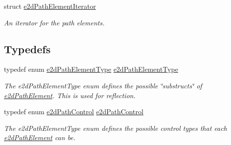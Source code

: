\begin{DoxyCompactItemize}
struct \hyperlink{structe2dPathElementIterator}{e2d\-Path\-Element\-Iterator}
\begin{DoxyCompactList}\small\item\em An iterator for the path elements. \end{DoxyCompactList}\end{DoxyCompactItemize}
\subsection*{Typedefs}
\begin{DoxyCompactItemize}
\item 
\hypertarget{group__e2dPath_gaa09c0421dbddd84d49f51a8027690c14}{typedef enum \hyperlink{group__e2dPath_gabecf8438085bebe6b28b4a8fb69b1507}{e2d\-Path\-Element\-Type} \hyperlink{group__e2dPath_gaa09c0421dbddd84d49f51a8027690c14}{e2d\-Path\-Element\-Type}}\label{group__e2dPath_gaa09c0421dbddd84d49f51a8027690c14}

\begin{DoxyCompactList}\small\item\em The e2d\-Path\-Element\-Type enum defines the possible \char`\"{}substructs\char`\"{} of \hyperlink{structe2dPathElement}{e2d\-Path\-Element}. This is used for reflection. \end{DoxyCompactList}\item 
\hypertarget{group__e2dPath_ga0d3a24fb02801eaea46759b37779650e}{typedef enum \hyperlink{group__e2dPath_ga0983472830124df9cdd854f7be1b6a06}{e2d\-Path\-Control} \hyperlink{group__e2dPath_ga0d3a24fb02801eaea46759b37779650e}{e2d\-Path\-Control}}\label{group__e2dPath_ga0d3a24fb02801eaea46759b37779650e}

\begin{DoxyCompactList}\small\item\em The e2d\-Path\-Element\-Type enum defines the possible control types that each \hyperlink{structe2dPathElement}{e2d\-Path\-Element} can be. \end{DoxyCompactList}\end{DoxyCompactItemize}
